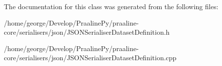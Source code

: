 The documentation for this class was generated from the following files\+:\begin{DoxyCompactItemize}
\item 
/home/george/\+Develop/\+Praaline\+Py/praaline-\/core/serialisers/json/J\+S\+O\+N\+Serialiser\+Dataset\+Definition.\+h\item 
/home/george/\+Develop/\+Praaline\+Py/praaline-\/core/serialisers/json/J\+S\+O\+N\+Serialiser\+Dataset\+Definition.\+cpp\end{DoxyCompactItemize}
